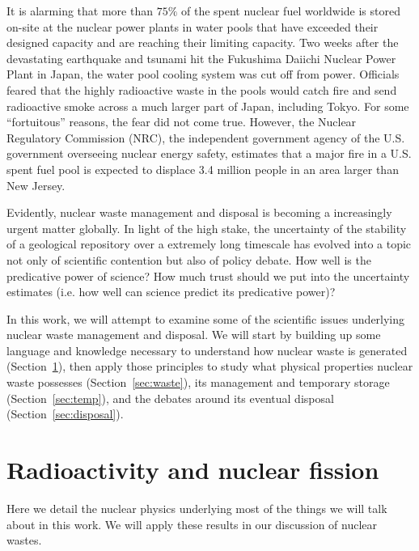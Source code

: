 \documentclass[nofootinbib,preprint,aip,pra]{revtex4-1}
\begin{document}
It is alarming that more than $75\%$ of the spent nuclear fuel worldwide is stored on-site at the nuclear power plants
in water pools that have exceeded their designed capacity and are reaching their limiting capacity.\cite{aa12}
Two weeks after the devastating earthquake and tsunami hit the Fukushima Daiichi Nuclear Power Plant in Japan,
the water pool cooling system was cut off from power. Officials feared that
the highly radioactive waste in the pools would catch fire and send radioactive smoke
across a much larger part of Japan, including Tokyo. For some ``fortuitous'' reasons, the fear did not come true.
However, the Nuclear Regulatory Commission (NRC), the independent government agency
of the U.S. government overseeing nuclear energy safety,
estimates that a major fire in a U.S. spent fuel pool is expected to
displace 3.4 million people in an area larger than New Jersey.\cite{s16}

Evidently, nuclear waste management and disposal is becoming a increasingly urgent matter globally.
In light of the high stake,
the uncertainty of the stability of a geological repository over a extremely long timescale has evolved into 
a topic not only of scientific contention but also of policy debate.
How well is the predicative power of science? How much trust should we put into the uncertainty estimates
(i.e. how well can science predict its predicative power)?

In this work, we will attempt to examine some of the scientific issues underlying nuclear waste management
and disposal. We will start by building up some
language and knowledge necessary to understand how nuclear waste is generated (Section~\ref{sec:phys}),
then apply those principles to study
what physical properties nuclear waste possesses (Section~\ref{sec:waste}), its management and temporary storage
(Section~\ref{sec:temp}), and the debates around its eventual disposal (Section~\ref{sec:disposal}).

\section{Radioactivity and nuclear fission}
\label{sec:phys}
    Here we detail the nuclear physics underlying most of the things we will talk about
    in this work. We will apply these results in our discussion of nuclear wastes.
\end{document}
